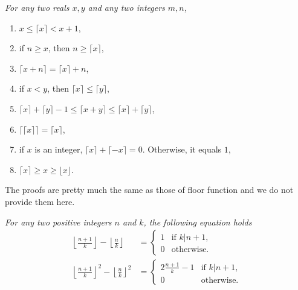 \documentclass[12pt]{subfile}
\begin{document}
        \begin{proposition}\slshape \label{prop:ceiling}
        	For any two reals $x, y$ and any two integers $m,n$,
        	\begin{enumerate}[1.]
        		\item $x\leq \lceil x\rceil < x+1$,
        		\item if $n \geq x$, then $n \geq \lceil x \rceil$,
        		\item $\lceil x+n\rceil=\lceil x\rceil+n$,
        		\item if $x <y$, then $\lceil x \rceil \leq \lceil y \rceil$,
        		\item $\lceil x\rceil+\lceil y \rceil - 1 \leq \lceil x+y\rceil \leq \lceil x\rceil+\lceil y\rceil$,
        		\item $\lceil \lceil x\rceil\rceil  =  \lceil x\rceil$,
        		\item if $x$ is an integer, $\lceil x\rceil+\lceil -x\rceil=0$. Otherwise, it equals $1$,
        		\item $\lceil x \rceil \geq x \geq \lfloor x \rfloor$.
        	\end{enumerate}
        \end{proposition}

    The proofs are pretty much the same as those of floor function and we do not provide them here.

        \begin{problem}\slshape\label{thm:floor-k|n+1}
        	For any two positive integers $n$ and $k$, the following equation holds
        	\begin{align*}
        	\left\lfloor \frac{n+1}{k} \right\rfloor - \left\lfloor \frac{n}{k} \right\rfloor &=
        	\begin{cases}
        	1&\mbox{if }k|n+1,\\
        	0&\mbox{otherwise.}
        	\end{cases}\\
        	\left\lfloor \frac{n+1}{k} \right\rfloor^2 - \left\lfloor \frac{n}{k} \right\rfloor^2 &=
        	\begin{cases}
        	2\frac{n+1}{k}-1&\mbox{if }k|n+1,\\
        	0&\mbox{otherwise.}
        	\end{cases}
        	\end{align*}
        \end{problem}
\end{document}
